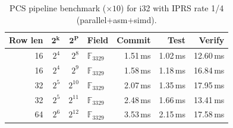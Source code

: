 \begin{table}[ht]
\centering
\caption{PCS pipeline benchmark ($\times10$) for i32 with IPRS rate 1/4 (parallel+asm+simd).}
\label{tab:pcs-pipeline-suite-i32}
\begin{tabular}{r r r l r r r}
\toprule
\textbf{Row len} & $\boldsymbol{2^k}$ & $\boldsymbol{2^P}$ & \textbf{Field} & \textbf{Commit} & \textbf{Test} & \textbf{Verify} \\
\midrule
     16 & $2^{4}$ & $2^{8}$ & $\mathbb{F}_{3329}$ & 1.51\,ms & 1.02\,ms & 12.60\,ms \\
     16 & $2^{4}$ & $2^{9}$ & $\mathbb{F}_{3329}$ & 1.58\,ms & 1.18\,ms & 16.84\,ms \\
     32 & $2^{5}$ & $2^{10}$ & $\mathbb{F}_{3329}$ & 2.07\,ms & 1.35\,ms & 17.95\,ms \\
     32 & $2^{5}$ & $2^{11}$ & $\mathbb{F}_{3329}$ & 2.48\,ms & 1.66\,ms & 13.41\,ms \\
     64 & $2^{6}$ & $2^{12}$ & $\mathbb{F}_{3329}$ & 3.53\,ms & 2.15\,ms & 17.58\,ms \\
\bottomrule
\end{tabular}
\end{table}
